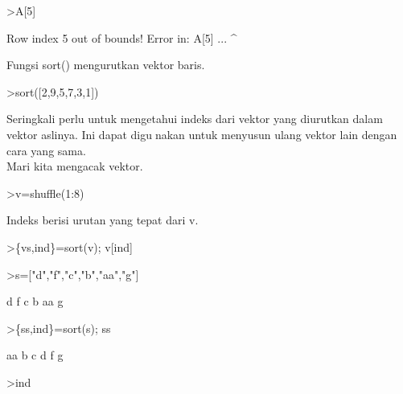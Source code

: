 \documentclass[a4paper,10pt]{article}
\begin{document}
\begin{eulernotebook}
\begin{eulercomment}
\begin{eulercomment}
\begin{eulercomment}
\begin{eulercomment}
\begin{eulerprompt}
>A[5]
\end{eulerprompt}
\begin{euleroutput}
  Row index 5 out of bounds!
  Error in:
  A[5] ...
      ^
\end{euleroutput}
\begin{eulercomment}
Fungsi sort() mengurutkan vektor baris.
\end{eulercomment}
\begin{eulerprompt}
>sort([2,9,5,7,3,1])
\end{eulerprompt}
\begin{euleroutput}
  [1,  2,  3,  5,  7,  9]
\end{euleroutput}
\begin{eulercomment}
Seringkali perlu untuk mengetahui indeks dari vektor yang diurutkan
dalam vektor aslinya. Ini dapat digunakan untuk menyusun ulang vektor
lain dengan cara yang sama.\\
Mari kita mengacak vektor.
\end{eulercomment}
\begin{eulerprompt}
>v=shuffle(1:8) 
\end{eulerprompt}
\begin{euleroutput}
  [2,  5,  6,  8,  7,  4,  3,  1]
\end{euleroutput}
\begin{eulercomment}
Indeks berisi urutan yang tepat dari v.
\end{eulercomment}
\begin{eulerprompt}
>\{vs,ind\}=sort(v); v[ind]
\end{eulerprompt}
\begin{euleroutput}
  [1,  2,  3,  4,  5,  6,  7,  8]
\end{euleroutput}
\begin{eulerprompt}
>s=["d","f","c","b","aa","g"]
\end{eulerprompt}
\begin{euleroutput}
  d
  f
  c
  b
  aa
  g
\end{euleroutput}
\begin{eulerprompt}
>\{ss,ind\}=sort(s); ss
\end{eulerprompt}
\begin{euleroutput}
  aa
  b
  c
  d
  f
  g
\end{euleroutput}
\begin{eulerprompt}
>ind
\end{eulerprompt}
\begin{euleroutput}
  [8,  1,  7,  6,  2,  3,  5,  4]

\end{euleroutput}
\end{eulercomment}
\end{eulercomment}
\end{eulercomment}
\end{eulercomment}
\end{eulernotebook}
\end{document}
